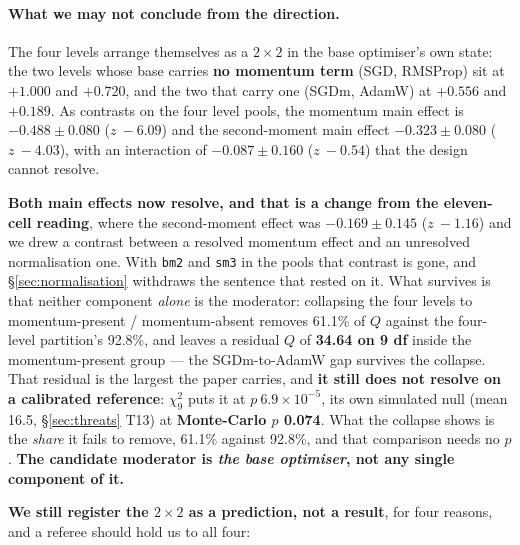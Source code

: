 \documentclass[10pt,letterpaper]{article}
\newcommand{\arm}[1]{\texttt{#1}}
\begin{document}
\paragraph{What we may not conclude from the direction.}
The four levels arrange themselves as a $2 \times 2$ in the base optimiser's own
state: the two levels whose base carries \textbf{no momentum term} (SGD, RMSProp) sit at
$+1.000$ and $+0.720$, and the two that carry one (SGDm, AdamW) at $+0.556$ and $+0.189$. As
contrasts on the four level pools, the momentum main effect is $\mathbf{-0.488 \pm 0.080}$
($z\ -6.09$) and the second-moment main effect $\mathbf{-0.323 \pm 0.080}$ ($z\ -4.03$), with an
interaction of $-0.087 \pm 0.160$ ($z\ -0.54$) that the design cannot resolve.

\textbf{Both main effects now resolve, and that is a change from the eleven-cell reading}, where
the second-moment effect was $-0.169 \pm 0.145$ ($z\ -1.16$) and we drew a contrast between a
resolved momentum effect and an unresolved normalisation one. With \arm{bm2} and \arm{sm3} in the
pools that contrast is gone, and \S\ref{sec:normalisation} withdraws the sentence that rested on
it. What survives is that neither component \emph{alone} is the moderator: collapsing the four
levels to momentum-present / momentum-absent removes 61.1\% of $Q$ against the four-level
partition's 92.8\%, and leaves a residual $Q$ of \textbf{34.64 on 9 df} inside the
momentum-present group --- the SGDm-to-AdamW gap survives the collapse. That residual is the
largest the paper carries, and \textbf{it still does not resolve on a calibrated reference}:
$\chi^2_9$ puts it at $p\ 6.9\times10^{-5}$, its own simulated null (mean 16.5,
\S\ref{sec:threats} T13) at \textbf{Monte-Carlo $p$ 0.074}. What the collapse shows is the
\emph{share} it fails to remove, 61.1\% against 92.8\%, and that comparison needs no $p$. \textbf{The
candidate moderator is \emph{the base optimiser}, not any single component of it.}

\textbf{We still register the $2 \times 2$ as a prediction, not a
result}, for four reasons, and a referee should hold us to all four:
\end{document}
